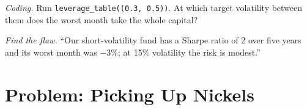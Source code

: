 \begin{exercise}[$\star\star\star$]\label{exo:s2:harvesting-the-variance-risk-premium:7}
\emph{Coding.} Run \texttt{leverage\_table((0.3, 0.5))}. At which target volatility between them does the worst month take the whole capital?
\end{exercise}

\begin{exercise}[$\star\star\star$]\label{exo:s2:harvesting-the-variance-risk-premium:8}
\emph{Find the flaw.} ``Our short-volatility fund has a Sharpe ratio of 2 over five years and its worst month was $-3\%$; at 15\% volatility the risk
is modest.''
\end{exercise}

\section{Problem: Picking Up Nickels}

